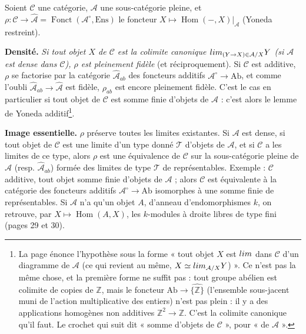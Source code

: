 \documentclass[11pt,a4paper]{article}
\begin{document}
Soient $\mathcal{C}$ une catégorie, $\mathcal{A}$ une sous-catégorie pleine,
et $\rho : \mathcal{C} \to \widehat{\mathcal{A}} =
\operatorname{Fonct}(\mathcal{A}^{\circ}, \mathrm{Ens})$ le foncteur
$X \mapsto \operatorname{Hom}(-, X)|_{\mathcal{A}}$ (Yoneda restreint).

\textbf{Densité.} \emph{Si tout objet $X$ de $\mathcal{C}$ est la colimite
canonique $\varinjlim_{(Y \to X) \in \mathcal{A}/X} Y$ (si $\mathcal{A}$ est
dense dans $\mathcal{C}$), $\rho$ est pleinement fidèle} (et
réciproquement). Si $\mathcal{C}$ est additive, $\rho$ se factorise par la
catégorie $\widehat{\mathcal{A}}_{ab}$ des foncteurs additifs
$\mathcal{A}^{\circ} \to \mathrm{Ab}$, et comme l'oubli
$\widehat{\mathcal{A}}_{ab} \to \widehat{\mathcal{A}}$ est fidèle, $\rho_{ab}$
est encore pleinement fidèle. C'est le cas en particulier si tout objet de
$\mathcal{C}$ est somme finie d'objets de $\mathcal{A}$ : c'est alors le
lemme de Yoneda additif\footnote{La page énonce l'hypothèse sous la forme
« tout objet $X$ est $\varinjlim$ dans $\mathcal{C}$ d'un diagramme de
$\mathcal{A}$ (ce qui revient au même, $X \simeq \varinjlim_{\mathcal{A}/X}
Y$) ». Ce n'est pas la même chose, et la première forme ne suffit pas : tout
groupe abélien est colimite de copies de $\mathbb{Z}$, mais le foncteur
$\mathrm{Ab} \to \widehat{\{\mathbb{Z}\}}$ (l'ensemble sous-jacent muni de
l'action multiplicative des entiers) n'est pas plein : il y a des
applications homogènes non additives $\mathbb{Z}^{2} \to \mathbb{Z}$. C'est
la colimite canonique qu'il faut. Le crochet qui suit dit « somme d'objets
de $\mathcal{C}$ », pour « de $\mathcal{A}$ ».}.

\textbf{Image essentielle.} $\rho$ préserve toutes les limites existantes.
Si $\mathcal{A}$ est dense, si tout objet de $\mathcal{C}$ est une limite
d'un type donné $\mathcal{T}$ d'objets de $\mathcal{A}$, et si
$\mathcal{C}$ a les limites de ce type, alors $\rho$ est une équivalence de
$\mathcal{C}$ sur la sous-catégorie pleine de $\widehat{\mathcal{A}}$ (resp.
$\widehat{\mathcal{A}}_{ab}$) formée des limites de type $\mathcal{T}$ de
représentables. Exemple : $\mathcal{C}$ additive, tout objet somme finie
d'objets de $\mathcal{A}$ ; alors $\mathcal{C}$ est équivalente à la
catégorie des foncteurs additifs $\mathcal{A}^{\circ} \to \mathrm{Ab}$
isomorphes à une somme finie de représentables. Si $\mathcal{A}$ n'a qu'un
objet $A$, d'anneau d'endomorphismes $k$, on retrouve, par $X \mapsto
\operatorname{Hom}(A, X)$, les $k$-modules à droite libres de type fini
(pages 29 et 30).
\end{document}
